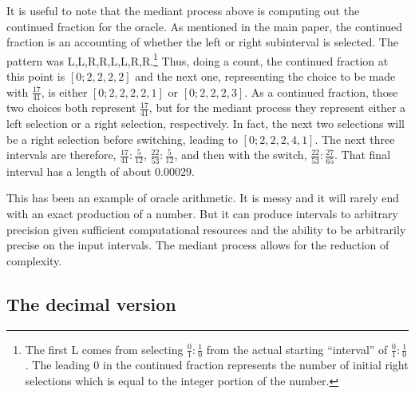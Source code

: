 \documentclass[12pt]{article}
\theoremstyle{remark}
\begin{document}
It is useful to note that the mediant process above is computing out the continued fraction for the oracle. As mentioned in the main paper, the continued fraction is an accounting of whether the left or right subinterval is selected. The pattern was L,L,R,R,L,L,R,R.\footnote{The first L comes from selecting $\frac{0}{1}: \frac{1}{0}$ from the actual starting ``interval'' of $\frac{0}{1}: \frac{1}{0}$. The leading 0 in the continued fraction represents the number of initial right selections which is equal to the integer portion of the number.} Thus, doing a count, the continued fraction at this point is $[0;2,2,2,2]$ and the next one, representing the choice to be made with $\frac{17}{41}$, is either $[0;2,2,2,2,1]$ or $[0;2,2,2,3]$. As a continued fraction, those two choices both represent $\frac{17}{41}$, but for the mediant process they represent either a left selection or a right selection, respectively. In fact, the next two selections will be a right selection before switching, leading to $[0;2,2,2,4,1]$. The next three intervals are therefore, $\frac{17}{41}: \frac{5}{12}$, $\frac{22}{53}: \frac{5}{12}$, and then with the switch, $\frac{22}{53}: \frac{27}{65}$. That final interval has a length of about $0.00029$. 

This has been an example of oracle arithmetic. It is messy and it will rarely end with an exact production of a number. But it can produce intervals to arbitrary precision given sufficient computational resources and the ability to be arbitrarily precise on the input intervals. The mediant process allows for the reduction of complexity. 

\subsection{The decimal version}
\end{document}
